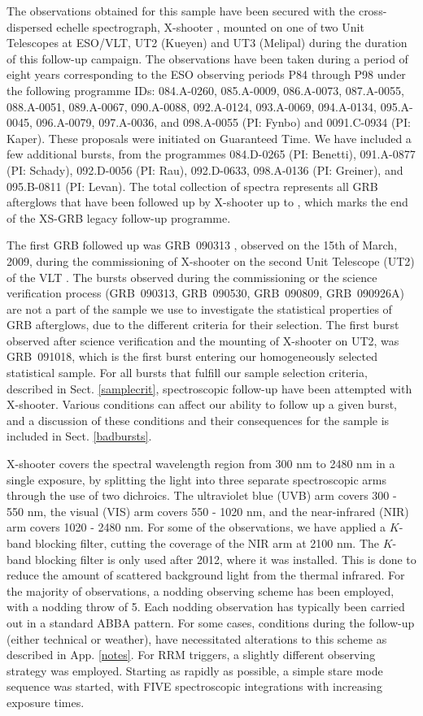 \documentclass[longauth]{aa}    %
\begin{document}
The observations obtained for this sample have been secured with the
cross-dispersed echelle spectrograph, X-shooter \citep{Vernet2011}, mounted on
one of two Unit Telescopes at ESO/VLT, UT2 (Kueyen) and UT3 (Melipal) during the
duration of this follow-up campaign. The observations have been taken during a
period of eight years corresponding to the ESO observing periods P84 through P98
under the following programme IDs: 084.A-0260, 085.A-0009, 086.A-0073,
087.A-0055, 088.A-0051, 089.A-0067, 090.A-0088, 092.A-0124, 093.A-0069,
094.A-0134, 095.A-0045, 096.A-0079, 097.A-0036, and 098.A-0055 (PI: Fynbo) and
0091.C-0934 (PI: Kaper). These proposals were initiated on Guaranteed Time. We
have included a few additional bursts, from the programmes 084.D-0265 (PI:
Benetti), 091.A-0877 (PI: Schady), 092.D-0056 (PI: Rau), 092.D-0633,
098.A-0136 (PI: Greiner), and 095.B-0811 (PI: Levan). The total collection of
spectra represents all GRB afterglows that have been followed up by
X-shooter up to \termdate, which marks the end of the XS-GRB legacy follow-up
programme.

The first GRB followed up was GRB~090313 \citep{DeUgartePostigo2010}, observed
on the 15th of March, 2009, during the commissioning of X-shooter on the second
Unit Telescope (UT2) of the VLT . The bursts observed during the commissioning
or the science verification process (GRB~090313, GRB~090530, GRB~090809,
GRB~090926A) are not a part of the sample we use to investigate the statistical
properties of GRB afterglows, due to the different criteria for their selection.
The first burst observed after science verification and the mounting of
X-shooter on UT2, was GRB~091018, which is the first burst entering our
homogeneously selected statistical sample. For all bursts that fulfill our
sample selection criteria, described in Sect. \ref{samplecrit}, spectroscopic
follow-up have been attempted with X-shooter. Various conditions can affect our
ability to follow up a given burst, and a discussion of these conditions and
their consequences for the sample is included in Sect. \ref{badbursts}.

X-shooter covers the spectral wavelength region from 300 nm to 2480 nm in a
single exposure, by splitting the light into three separate spectroscopic arms
through the use of two dichroics. The ultraviolet blue (UVB) arm covers 300 -
550 nm, the visual (VIS) arm covers 550 - 1020 nm, and the near-infrared (NIR)
arm covers 1020 - 2480 nm. For some of the observations, we have applied a
$K$-band blocking filter, cutting the coverage of the NIR arm at 2100 nm. The
$K$-band blocking filter is only used after 2012, where it was installed. This
is done to reduce the amount of scattered background light from the thermal
infrared. For the majority of observations, a nodding observing scheme
has been employed, with a nodding throw of 5\arcsec. Each nodding observation
has typically been carried out in a standard ABBA pattern. For some cases,
conditions during the follow-up (either technical or weather), have necessitated
alterations to this scheme as described in App. \ref{notes}. For RRM triggers, a
slightly different observing strategy was employed. Starting as rapidly as
possible, a simple stare mode sequence was started, with FIVE spectroscopic
integrations with increasing exposure times.
\end{document}

